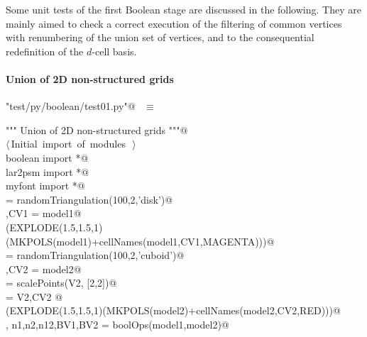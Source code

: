 \documentclass[11pt,oneside]{article}	%
\begin{document}
Some unit tests of the first Boolean stage are discussed in the following. They are mainly aimed to check a correct execution of the filtering of common vertices with renumbering of the union set of vertices, and to the consequential redefinition of the $d$-cell basis.

\paragraph{Union of 2D non-structured grids}

\begin{flushleft} \small
\begin{minipage}{\linewidth} \label{scrap22}
\verb@"test/py/boolean/test01.py"@\nobreak\ {\footnotesize {} }$\equiv$
\vspace{-1ex}
\begin{list}{}{} \item
\mbox{}\verb@""" Union of 2D non-structured grids """@\\
\mbox{}\verb@@\hbox{$\langle\,$Initial import of modules\nobreak\ {\footnotesize {}}$\,\rangle$}\verb@@\\
\mbox{}\verb@from boolean import *@\\
\mbox{}\verb@from lar2psm import *@\\
\mbox{}\verb@from myfont import *@\\
\mbox{} = randomTriangulation(100,2,'disk')@\\
\mbox{},CV1 = model1@\\
\mbox{}\verb@VIEW(EXPLODE(1.5,1.5,1)(MKPOLS(model1)+cellNames(model1,CV1,MAGENTA)))@\\
\mbox{} = randomTriangulation(100,2,'cuboid')@\\
\mbox{},CV2 = model2@\\
\mbox{} = scalePoints(V2, [2,2])@\\
\mbox{} = V2,CV2 @\\
\mbox{}\verb@VIEW(EXPLODE(1.5,1.5,1)(MKPOLS(model2)+cellNames(model2,CV2,RED)))@\\
\mbox{}\verb@V, n1,n2,n12,BV1,BV2 = boolOps(model1,model2)@\\
\mbox{}\verb@@{\NWsep}
\end{list}
\vspace{-2ex}
\end{minipage}\\[4ex]
\end{flushleft}
\end{document}
